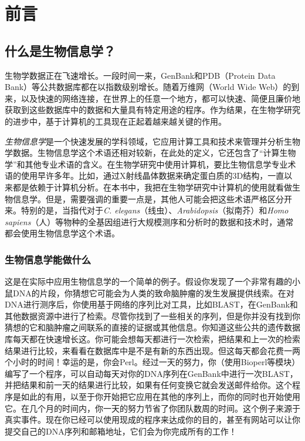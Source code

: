 \setcounter{page}{1}
\chapter*{前\quad 言}

\section*{什么是生物信息学？}
生物学数据正在飞速增长。一段时间一来，GenBank和PDB（Protein Data
Bank）等公共数据库都在以指数级别增长。随着万维网（World Wide
Web）的到来，以及快速的网络连接，在世界上的任意一个地方，都可以快速、简便且廉价地获取到这些数据库中的数据和大量具有特定用途的程序。作为结果，在生物学研究的进步中，基于计算机的工具现在正起着越来越关键的作用。

\textit{生物信息学}是一个快速发展的学科领域，它应用计算工具和技术来管理并分析生物学数据。生物信息学这个术语还相对较新，在此处的定义，它还包含了“计算生物学”和其他专业术语的含义。在生物学研究中使用计算机，要比生物信息学专业术语的使用早许多年。比如，通过X射线晶体数据来确定蛋白质的3D结构，一直以来都是依赖于计算机分析。在本书中，我把在生物学研究中计算机的使用就看做生物信息学。但是，需要强调的重要一点是，其他人可能会把这些术语严格区分开来。特别的是，当指代对于\textit{C.  elegans}（线虫）、\textit{Arabidopsis}（拟南芥）和\textit{Homo sapiens}（人）等物种的全基因组进行大规模测序和分析时的数据和技术时，通常都会使用生物信息学这个术语。

\subsection*{生物信息学能做什么}
这是在实际中应用生物信息学的一个简单的例子。假设你发现了一个非常有趣的小鼠DNA的片段，你猜想它可能会为人类的致命脑肿瘤的发生发展提供线索。在对DNA进行测序后，你使用基于网络的序列比对工具，比如BLAST，在GenBank和其他数据资源中进行了检索。尽管你找到了一些相关的序列，但是你并没有找到你猜想的它和脑肿瘤之间联系的直接的证据或其他信息。你知道这些公共的遗传数据库每天都在快速增长这。你可能会想每天都进行一次检索，把结果和上一次的检索结果进行比较，来看看在数据库中是不是有新的东西出现。但这每天都会花费一两个小时的时间！幸运的是，你会Perl。经过一天的努力，你（使用Bioperl等模块）编写了一个程序，可以自动每天对你的DNA序列在GenBank中进行一次BLAST，并把结果和前一天的结果进行比较，如果有任何变换它就会发送邮件给你。这个程序是如此的有用，以至于你开始把它应用在其他的序列上，而你的同时也开始使用它。在几个月的时间内，你一天的努力节省了你团队数周的时间。这个例子来源于真实事件。现在你已经可以使用现成的程序来达成你的目的，甚至有网站可以让你提交自己的DNA序列和邮箱地址，它们会为你完成所有的工作！

